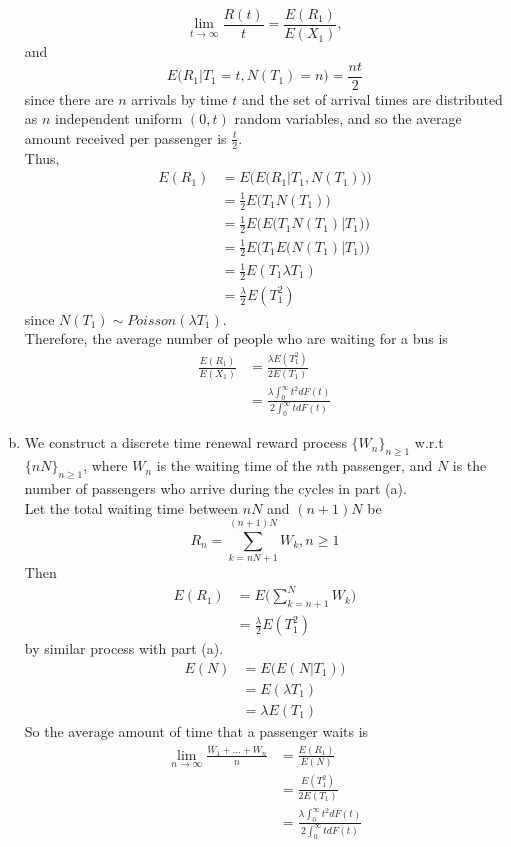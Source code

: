 \documentclass{amsart}
\theoremstyle{plain}
\theoremstyle{definition}
\begin{document}
\begin{enumerate}[(a)]
	\[\lim_{t\to \infty} \frac{R(t)}{t} = \frac{E(R_1)}{E(X_1)},\]
	and 
	\[ E\big(R_1|T_1=t, N(T_1)=n\big) = \frac{nt}{2}\]
	since there are $n$ arrivals by time $t$ and the set of arrival times are distributed as $n$ independent uniform $(0,t)$ random variables, and so the average amount received per passenger is $\frac{t}{2}$.\\
	Thus, 
	\begin{align*}
		E (R_1)  &= E\Big(E\big(R_1|T_1, N(T_1)\big)\Big) \\
				 &= \frac{1}{2}E\big(T_1N(T_1)\big) \\	
			    		&= \frac{1}{2}E\Big(E\big(T_1N(T_1) | T_1\big)\Big)\\
					    &= \frac{1}{2}E\Big(T_1 E\big(N(T_1)|T_1\big)\Big)\\
						 &= \frac{1}{2}E(T_1 \lambda T_1)\\
						 &= \frac{\lambda}{2}E(T_1^2)
	\end{align*}
	since $N(T_1) \sim Poisson(\lambda T_1)$.\\
	Therefore, the average number of people who are waiting for a bus is 
	\begin{align*}
	 	\frac{E(R_1)}{E(X_1)} &= \frac{\lambda E(T_1^2)}{2E(T_1)} \\
	 							&= \frac{\lambda \int_{0}^{\infty} t^2 dF(t)}{2\int_{0}^{\infty} t dF(t)}
 	\end{align*}
	\item
		We construct a discrete time renewal reward process $\{W_n\}_{n\geq 1}$ w.r.t $\{nN\}_{n\geq 1}$, where $W_n$ is the waiting time of the $n$th passenger, and $N$ is the number of passengers who arrive during the cycles in part (a).\\
	Let the total waiting time between $nN$ and $(n+1)N$ be
	\[ R_n = \sum_{k=nN +1}^{(n+1)N}W_k, n\geq 1 \]
	Then
	\begin{align*}
		E(R_1) &= E\Bigg(\sum_{k=n+1}^{N}W_k\Bigg) \\
			   &= \frac{\lambda}{2}E(T_1^2)
	\end{align*}
	by similar process with part (a).
	\begin{align*}
		E(N) &= E\big(E(N|T_1)\big)\\
			 &= E(\lambda T_1) \\
			 &=\lambda E(T_1)
	\end{align*}
	So the average amount of time that a passenger waits is 
	\begin{align*}
		\lim_{n\to \infty} \frac{W_1 + ... + W_n}{n} &= \frac{E(R_1)}{E(N)} \\
									  &=\frac{E(T_1^2)}{2E(T_1)} \\
									  &=\frac{\lambda \int_{0}^{\infty} t^2 dF(t)}{2\int_{0}^{\infty} t dF(t)}
	\end{align*}

\end{enumerate}	
\end{document}
